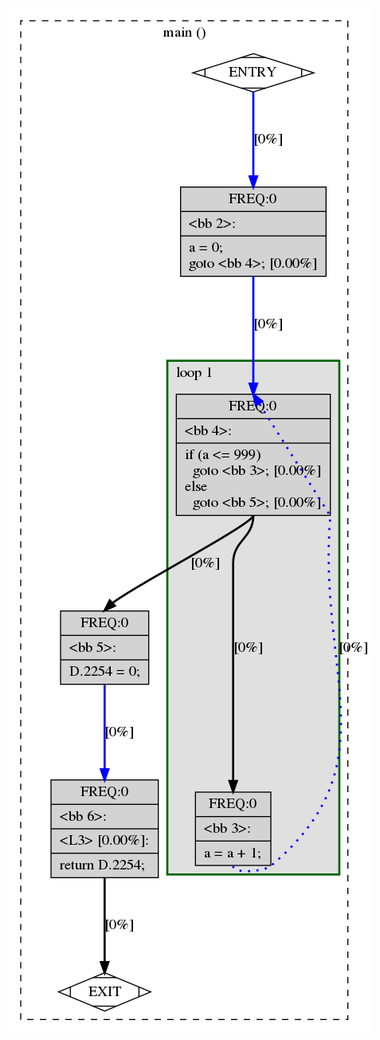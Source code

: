 \begin{multicols}{2}

\begin{center}
    \includegraphics[scale=0.3]{images/graph2.png}
\end{center}
\end{multicols}

